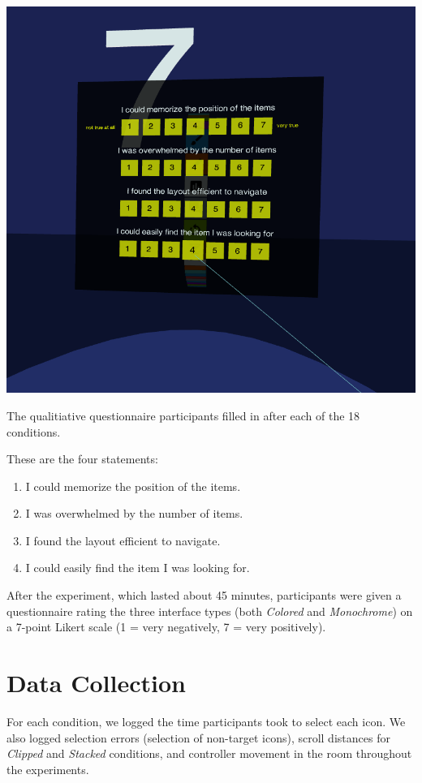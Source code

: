 \documentclass[nobib]{tufte-book} %
\begin{document}
\begin{marginfigure}
  \includegraphics{questionnaire.png}
  \caption{The qualitiative questionnaire participants filled in after each of the 18 conditions.}
  \label{fig:questionnaire}
\end{marginfigure}

These are the four statements:

\begin{enumerate}[label=\arabic*. , wide=0.5em,  leftmargin=*]
  \item I could memorize the position of the items.
  \item I was overwhelmed by the number of items.
  \item I found the layout efficient to navigate.
  \item I could easily find the item I was looking for.
\end{enumerate}


After the experiment, which lasted about 45 minutes, participants were given a questionnaire rating the three interface types (both \emph{Colored} and \emph{Monochrome}) on a 7-point Likert scale (1 = very negatively, 7 = very positively).

\section{Data Collection}
For each condition, we logged the time participants took to select each icon. We also logged selection errors (selection of non-target icons), scroll distances for \emph{Clipped} and \emph{Stacked} conditions, and controller movement in the room throughout the experiments.
\end{document}
